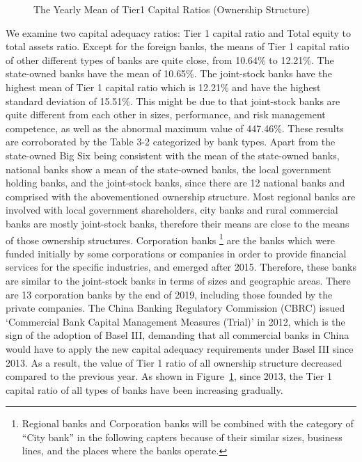 \documentclass[
  12pt,
  a4paper,
]{scrreprt}
\begin{document}
{{{{\begin{figure}
{}

\caption{\label{fig-CAMELTier1}The Yearly Mean of Tier1 Capital Ratios
(Ownership Structure)}

\end{figure}%

We examine two capital adequacy ratios: Tier 1 capital ratio and Total
equity to total assets ratio. Except for the foreign banks, the means of
Tier 1 capital ratio of other different types of banks are quite close,
from 10.64\% to 12.21\%. The state-owned banks have the mean of 10.65\%.
The joint-stock banks have the highest mean of Tier 1 capital ratio
which is 12.21\% and have the highest standard deviation of 15.51\%.
This might be due to that joint-stock banks are quite different from
each other in sizes, performance, and risk management competence, as
well as the abnormal maximum value of 447.46\%. These results are
corroborated by the Table 3-2 categorized by bank types. Apart from the
state-owned Big Six being consistent with the mean of the state-owned
banks, national banks show a mean of the state-owned banks, the local
government holding banks, and the joint-stock banks, since there are 12
national banks and comprised with the abovementioned ownership
structure. Most regional banks are involved with local government
shareholders, city banks and rural commercial banks are mostly
joint-stock banks, therefore their means are close to the means of those
ownership structures. Corporation banks \footnote{Regional banks and
  Corporation banks will be combined with the category of ``City bank''
  in the following capters because of their similar sizes, business
  lines, and the places where the banks operate.} are the banks which
were funded initially by some corporations or companies in order to
provide financial services for the specific industries, and emerged
after 2015. Therefore, these banks are similar to the joint-stock banks
in terms of sizes and geographic areas. There are 13 corporation banks
by the end of 2019, including those founded by the private companies.
The China Banking Regulatory Commission (CBRC) issued `Commercial Bank
Capital Management Measures (Trial)' in 2012, which is the sign of the
adoption of Basel III, demanding that all commercial banks in China
would have to apply the new capital adequacy requirements under Basel
III since 2013. As a result, the value of Tier 1 ratio of all ownership
structure decreased compared to the previous year. As shown in
Figure~\ref{fig-CAMELTier1}, since 2013, the Tier 1 capital ratio of all
types of banks have been increasing gradually.

}}}}
\end{document}
